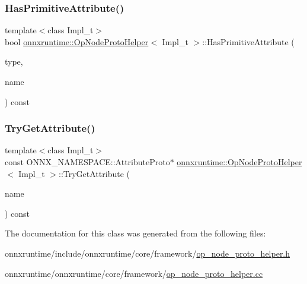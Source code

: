 \subsubsection{\texorpdfstring{Has\+Primitive\+Attribute()}{HasPrimitiveAttribute()}}
{\footnotesize\ttfamily template$<$class Impl\+\_\+t$>$ \\
bool \mbox{\hyperlink{classonnxruntime_1_1OpNodeProtoHelper}{onnxruntime\+::\+Op\+Node\+Proto\+Helper}}$<$ Impl\+\_\+t $>$\+::Has\+Primitive\+Attribute (\begin{DoxyParamCaption}\item[{O\+N\+N\+X\+\_\+\+N\+A\+M\+E\+S\+P\+A\+C\+E\+::\+Attribute\+Proto\+\_\+\+Attribute\+Type}]{type,  }\item[{const std\+::string \&}]{name }\end{DoxyParamCaption}) const\hspace{0.3cm}{\ttfamily [noexcept]}}

\mbox{\label{classonnxruntime_1_1OpNodeProtoHelper_a6163876dfd97f4e055cdd25bc2a3750c}} 
\subsubsection{\texorpdfstring{Try\+Get\+Attribute()}{TryGetAttribute()}}
{\footnotesize\ttfamily template$<$class Impl\+\_\+t$>$ \\
const O\+N\+N\+X\+\_\+\+N\+A\+M\+E\+S\+P\+A\+C\+E\+::\+Attribute\+Proto$\ast$ \mbox{\hyperlink{classonnxruntime_1_1OpNodeProtoHelper}{onnxruntime\+::\+Op\+Node\+Proto\+Helper}}$<$ Impl\+\_\+t $>$\+::Try\+Get\+Attribute (\begin{DoxyParamCaption}\item[{const std\+::string \&}]{name }\end{DoxyParamCaption}) const\hspace{0.3cm}{\ttfamily [inline]}}



The documentation for this class was generated from the following files\+:\begin{DoxyCompactItemize}
\item 
onnxruntime/include/onnxruntime/core/framework/\mbox{\hyperlink{op__node__proto__helper_8h}{op\+\_\+node\+\_\+proto\+\_\+helper.\+h}}\item 
onnxruntime/onnxruntime/core/framework/\mbox{\hyperlink{op__node__proto__helper_8cc}{op\+\_\+node\+\_\+proto\+\_\+helper.\+cc}}\end{DoxyCompactItemize}
